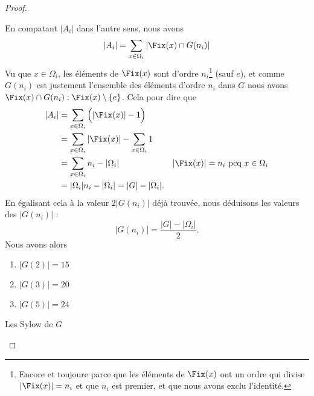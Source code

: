 \begin{proof}
\begin{subproof}
                En compatant \( | A_i |\) dans l'autre sens, nous avons
                \begin{equation}        \label{EQooBHIIooVcGgFd}
                    | A_i |=\sum_{x\in \Omega_i}|  \Fix(x)\cap G(n_i) |
                \end{equation}
                Vu que \( x\in \Omega_i\), les éléments de \( \Fix(x)\) sont d'ordre \( n_i\)\footnote{Encore et toujoure parce que les éléments de \( \Fix(x)\) ont un ordre qui divise \( | \Fix(x) |=n_i\) et que \( n_i\) est premier, et que nous avons exclu l'identité.} (sauf \( e\)), et comme \( G(n_i)\) est justement l'ensemble des éléments d'ordre \( n_i\) dans \( G\) nous avons \( \Fix(x)\cap G(n_i):\Fix(x)\setminus\{ e \}\). Cela pour dire que
                \begin{subequations}
                    \begin{align}
                        | A_i |&=\sum_{x\in \Omega_i}\Big( |\Fix(x)|-1\Big)\\
                        &=\sum_{x\in \Omega_i}| \Fix(x) |-\sum_{x\in \Omega_i}1\\
                        &=\sum_{x\in \Omega_i}n_i-| \Omega_i |  & | \Fix(x) |=n_i \text{ pcq }x\in\Omega_i\\
                        &=| \Omega_i |n_i-| \Omega_i |=| G |-| \Omega_i |.
                    \end{align}
                \end{subequations}
                En égalisant cela à la valeur \( 2|G(n_i)|\) déjà trouvée, nous déduisons les valeurs des \( | G(n_i) |\) :
                \begin{equation}
                    | G(n_i) |=\frac{ | G |-| \Omega_i | }{2}.
                \end{equation}
                Nous avons alors
                \begin{enumerate}
                    \item
                        \( | G(2) |=15\)
                    \item
                        \( | G(3) |=20\)
                    \item
                        \( | G(5) |=24\)
                \end{enumerate}

            \item[Les Sylow de \( G\)]


\end{subproof}
\end{proof}
